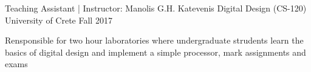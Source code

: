 \begin{cventries}
  \cventry
    {Teaching Assistant | Instructor: Manolis G.H. Katevenis} %
    {Digital Design (CS-120)} %
    {University of Crete} %
    {Fall 2017} %
    {
      \begin{cvitems} %
        \item{Rensponsible for two hour laboratories where
            undergraduate strudents learn the basics of digital design
              and implement a simple processor, mark assignments and
              exams}
      \end{cvitems}
    }

\end{cventries}
